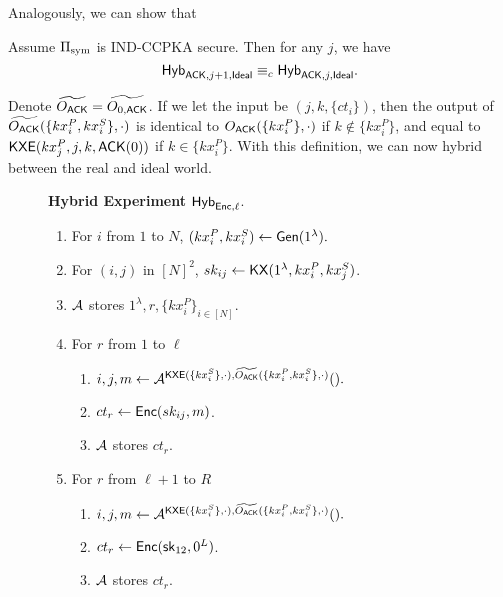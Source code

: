 Analogously, we can show that
\begin{lemma}
     Assume $\Pi_{\text{sym}}$ is IND-CCPKA secure. Then for any $j$, we have 
    $$\mathsf{Hyb}_{\mathsf{ACK}, j + 1, \mathsf{Ideal}} \equiv_c \mathsf{Hyb}_{\mathsf{ACK}, j, \mathsf{Ideal}}.$$
\end{lemma}
Denote $\widetilde{O_{\mathsf{ACK}}} = \widetilde{O_{0, \mathsf{ACK}}}$. If we let the input be $(j, k, \{ct_i\})$, then the output of $\widetilde{O_{\mathsf{ACK}}}(\{kx_i^P, kx_i^S\}, \cdot)$ is identical to $O_{\mathsf{ACK}}(\{kx_i^P\}, \cdot)$ if $k \notin \{kx_i^P\}$, and equal to $\mathsf{KXE}(kx_j^P, j, k, \mathsf{ACK}(0))$ if $k \in \{kx_i^P\}$. With this definition, we can now hybrid between the real and ideal world.

\begin{figure}[h!]
\begin{framed}
\textbf{Hybrid Experiment} $\mathsf{Hyb}_{\mathsf{Enc}, \ell}$.
\begin{enumerate}
    \item For $i$ from $1$ to $N$, $(kx_i^P, kx_i^S) \leftarrow \mathsf{Gen}(1^{\lambda}).$
    \item For $(i, j)$ in $[N]^2$, $sk_{ij} \leftarrow \mathsf{KX}(1^{\lambda}, kx_i^P, kx_j^S)$.
    \item $\mathcal{A}$ stores $1^{\lambda}, r, \{kx_i^P\}_{i \in [N]}$.
    \item For $r$ from $1$ to $\ell$
    \begin{enumerate}
        \item $i, j, m \leftarrow \mathcal{A}^{\mathsf{KXE}(\{kx_i^S\}, \cdot), \widetilde{O_{\mathsf{ACK}}}(\{kx_i^P, kx_i^S\}, \cdot)}().$
        \item $ct_r \leftarrow \mathsf{Enc}(sk_{ij}, m)$.
        \item $\mathcal{A}$ stores $ct_r$.
    \end{enumerate}
    \item For $r$ from $\ell + 1$ to $R$
    \begin{enumerate}
        \item $i, j, m \leftarrow \mathcal{A}^{\mathsf{KXE}(\{kx_i^S\}, \cdot), \widetilde{O_{\mathsf{ACK}}}(\{kx_i^P, kx_i^S\}, \cdot)}().$
        \item $ct_r \leftarrow \mathsf{Enc}({\mathsf{sk}}_{12}, 0^{L})$.
        \item $\mathcal{A}$ stores $ct_r$.
    \end{enumerate}
\end{enumerate}
\end{framed}
\end{figure}

